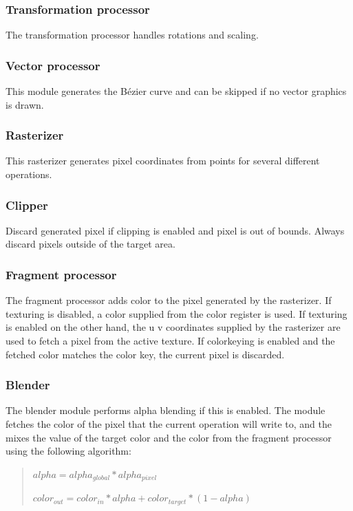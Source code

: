 \documentclass[10pt,a4paper]{article}
\begin{document}
\subsubsection{Transformation processor}
The transformation processor handles rotations and scaling.

\subsubsection{Vector processor}
This module generates the B\'{e}zier curve and can be skipped if no vector graphics is drawn.

\subsubsection{Rasterizer}
This rasterizer generates pixel coordinates from points for several different operations.

\subsubsection{Clipper}
Discard generated pixel if clipping is enabled and pixel is out of bounds. Always discard pixels outside of the target area.

\subsubsection{Fragment processor}
The fragment processor adds color to the pixel generated by the rasterizer. If texturing is disabled, a color supplied from the color register is used. If texturing is enabled on the other hand, the u v coordinates supplied by the rasterizer are used to fetch a pixel from the active texture. If colorkeying is enabled and the fetched color matches the color key, the current pixel is discarded.

\subsubsection{Blender}
The blender module performs alpha blending if this is enabled. The module fetches the color of the pixel that the current operation will write to, and the mixes the value of the target color and the color from the fragment processor using the following algorithm:

\begin{quote}
$ alpha = alpha_{global} * alpha_{pixel} $

$ color_{out} = color_{in} * alpha + color_{target} * (1 - alpha) $
\end{quote}
\end{document}
